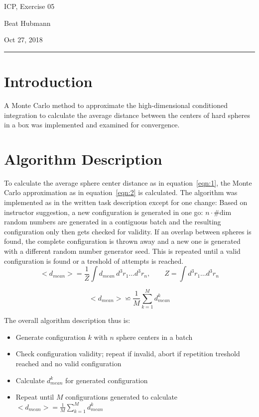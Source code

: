 \documentclass[11pt,a4paper]{article}
\begin{document}
\noindent\parbox{\linewidth}{
 \parbox{.25\linewidth}{ \large ICP, Exercise 05 }\hfill
 \parbox{.5\linewidth}{\begin{center} \large Beat Hubmann \end{center}}\hfill
 \parbox{.2\linewidth}{\begin{flushright} \large Oct 27, 2018 \end{flushright}}
}
\noindent\rule{\linewidth}{2pt}


\section{Introduction}

A Monte Carlo method to approximate the high-dimensional conditioned integration to calculate the average distance
between the centers of hard spheres in a box was implemented and examined for convergence.

\section{Algorithm Description}
To calculate the average sphere center distance as in equation~\ref{eqn:1}, the Monte Carlo approximation as in equation~\ref{eqn:2}
is calculated. The algorithm was implemented as in the written task description except for one change: Based on instructor suggestion,
a new configuration is generated in one go: $ n \cdot \text{\# dim} $ random numbers are generated in a contiguous batch and the resulting
configuration only then gets checked for validity. If an overlap between spheres is found, the complete configuration is thrown away and
 a new one is generated with a different random number generator seed. This is repeated until a valid configuration is found or 
 a treshold of attempts is reached. \\

\begin{equation}
<d_{mean}> = \frac{1}{Z} \int d_{mean} \, d^3 r_1 \ldots d^3 r_n, \qquad Z = \int d^3 r_1 \ldots d^3 r_n
\label{eqn:1}	
\end{equation}


\begin{equation}
<d_{mean}> \backsimeq \frac{1}{M} \sum_{k=1}^{M} d_{mean}^k
\label{eqn:2}	
\end{equation}

 The overall algorithm description thus is: \\
 \begin{itemize}

 \item Generate configuration $k$ with $n$ sphere centers in a batch
 \item Check configuration validity; repeat if invalid, abort if repetition treshold reached and no valid configuration
 \item Calculate $d_{mean}^k$ for generated configuration
 \item Repeat until $M$ configurations generated to calculate $<d_{mean}> = \frac{1}{M}\sum_{k=1}^{M}d_{mean}^k$



\end{itemize}
\end{document}

